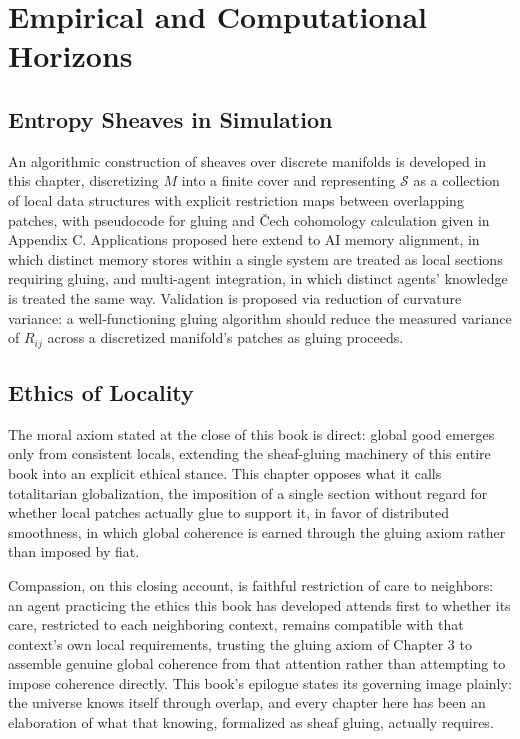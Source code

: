 \part{Empirical and Computational Horizons}

\chapter{Entropy Sheaves in Simulation}

An algorithmic construction of sheaves over discrete manifolds is developed in this chapter, discretizing $M$ into a finite cover and representing $\mathcal{S}$ as a collection of local data structures with explicit restriction maps between overlapping patches, with pseudocode for gluing and Čech cohomology calculation given in Appendix C. Applications proposed here extend to AI memory alignment, in which distinct memory stores within a single system are treated as local sections requiring gluing, and multi-agent integration, in which distinct agents' knowledge is treated the same way. Validation is proposed via reduction of curvature variance: a well-functioning gluing algorithm should reduce the measured variance of $R_{ij}$ across a discretized manifold's patches as gluing proceeds.

\chapter{Ethics of Locality}

The moral axiom stated at the close of this book is direct: global good emerges only from consistent locals, extending the sheaf-gluing machinery of this entire book into an explicit ethical stance. This chapter opposes what it calls totalitarian globalization, the imposition of a single section without regard for whether local patches actually glue to support it, in favor of distributed smoothness, in which global coherence is earned through the gluing axiom rather than imposed by fiat.

Compassion, on this closing account, is faithful restriction of care to neighbors: an agent practicing the ethics this book has developed attends first to whether its care, restricted to each neighboring context, remains compatible with that context's own local requirements, trusting the gluing axiom of Chapter 3 to assemble genuine global coherence from that attention rather than attempting to impose coherence directly. This book's epilogue states its governing image plainly: the universe knows itself through overlap, and every chapter here has been an elaboration of what that knowing, formalized as sheaf gluing, actually requires.

